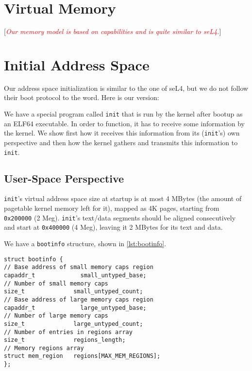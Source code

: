 \documentclass[a4paper,11pt,twoside]{report}
\newcommand{\todo}[1]{[\textcolor{red}{\emph{#1}}]}
\begin{document}
\section{Virtual Memory}

\todo{Our memory model is based on capabilities and is quite similar to seL4.}

\section{Initial Address Space}

Our address space initialization is similar to the one of seL4, but
we do not follow their boot protocol to the word. Here is our
version:

We have a special program called \lstinline+init+ that is run by the kernel
after bootup as an ELF64 executable. In order to function, it has to
receive some information by the kernel. We show first how it
receives this information from its (\lstinline+init+'s) own perspective and
then how the kernel gathers and transmits this information to
\lstinline+init+.

\subsection{User-Space Perspective}

\lstinline+init+'s virtual address space size at startup is at most 4 MBytes
(the amount of pagetable kernel memory left for it), mapped as 4K
pages, starting from \lstinline+0x200000+ (2 Meg). \lstinline+init+'s text/data segments
should be aligned consecutively and start at \lstinline+0x400000+ (4 Meg),
leaving it 2 MBytes for its text and data.

We have a \lstinline+bootinfo+ structure, shown in \autoref{lst:bootinfo}.

\begin{lstlisting}[float,caption={\lstinline+bootinfo+ structure},
label=lst:bootinfo]
struct bootinfo {
// Base address of small memory caps region
capaddr_t             small_untyped_base;
// Number of small memory caps
size_t              small_untyped_count;
// Base address of large memory caps region
capaddr_t             large_untyped_base;
// Number of large memory caps
size_t              large_untyped_count;
// Number of entries in regions array
size_t              regions_length;
// Memory regions array
struct mem_region   regions[MAX_MEM_REGIONS];
};
\end{lstlisting}
\end{document}
